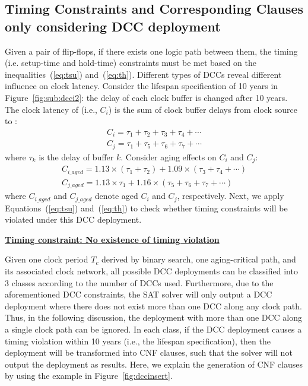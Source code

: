 \subsection{Timing Constraints and Corresponding Clauses only considering DCC deployment}
\label{subsec:tccc}
Given a pair of flip-flops, if there exists one logic path between them, the timing (i.e. setup-time and hold-time) constraints must be met based on the inequalities~(\ref{eq:tsu}) and~(\ref{eq:th}). Different types of DCCs reveal different influence on clock latency. Consider the lifespan specification of 10 years in Figure~\ref{fig:sub:dcci2}: the delay of each clock buffer is changed after 10 years. The clock latency of  (i.e., $C_i$) is the sum of clock buffer delays from clock source to : 
\begin{gather*}
C_i = \tau_1 + \tau_2 + \tau_3 + \tau_4 +\dotsb \\
C_j = \tau_1 + \tau_5 + \tau_6 + \tau_7 +\dotsb
\end{gather*}
where $\tau_k$ is the delay of buffer $k$. Consider aging effects on $C_i$ and $C_j$: 
\begin{gather*}
C_{i\_aged} = 1.13 \times \left(\tau_1 + \tau_2\right) + 1.09 \times \left(\tau_3 + \tau_4 + \dotsb\right)\\
C_{j\_aged} = 1.13 \times \tau_1+ 1.16 \times \left( \tau_5 + \tau_6 + \tau_7 + \dotsb \right)
\end{gather*}
where $C_{i\_aged}$ and $C_{j\_aged}$ denote aged $C_i$ and $C_j$, respectively. Next, we apply Equations~(\ref{eq:tsu}) and~(\ref{eq:th}) to check whether timing constraints will be violated under this DCC deployment.

\noindent \textbf{\uline{Timing constraint: No existence of timing violation}}

Given one clock period $T_c$ derived by binary search, one aging-critical path, and its associated clock network, all possible DCC deployments can be classified into 3 classes according to the number of DCCs used. Furthermore, due to the aforementioned DCC constraints, the SAT solver will only output a DCC deployment where there does not exist more than one DCC along any clock path. Thus, in the following discussion, the deployment with more than one DCC along a single clock path can be ignored. In each class, if the DCC deployment causes a timing violation within 10 years (i.e., the lifespan specification), then the deployment will be transformed into CNF clauses, such that the solver will not output the deployment as results. Here, we explain the generation of CNF clauses by using the example in Figure~\ref{fig:dccinsert}.

